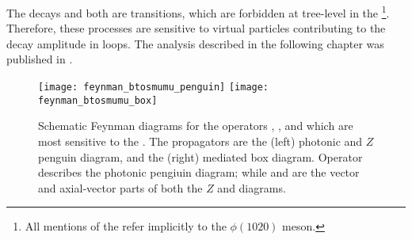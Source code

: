 
The decays \btokpipimumu and \btophikmumu both are \decay{\bquark}{\squark\mumu} \fcnc
transitions, which are forbidden at tree-level in the \sm\footnote{All mentions of the \phii
  refer implicitly to the $\phi(1020)$ meson.
}.
Therefore, these processes are sensitive to virtual \np particles contributing
to the decay amplitude in loops.
The analysis described in the following chapter was published in .



\begin{figure}
  \begin{center}
    \texttt{[image: feynman\_btosmumu\_penguin]}
    \texttt{[image: feynman\_btosmumu\_box]}
    \caption[Schematic Feynman diagrams for loop and box diagrams]
    {
      Schematic Feynman diagrams for the operators , , and  which are most sensitive
      to the \decay{\bquark}{\squark\mumu} \fcnc.
      The propagators are the (left) photonic and $Z$ penguin diagram, and the (right) \Wp mediated
      box diagram.
      Operator  describes the photonic pengiuin diagram; while  and  are the
      vector and axial-vector parts of both the $Z$ and \Wp diagrams.
    }
    \label{fig:hhh:loops}
  \end{center}
\end{figure}

